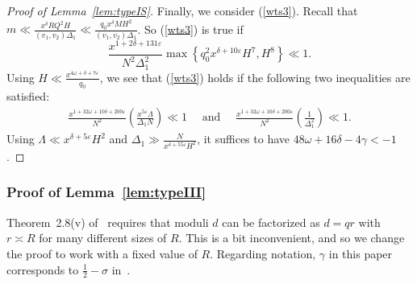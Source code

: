 \documentclass{amsart}
\numberwithin{equation}{section}
\begin{document}
\begin{proof}[Proof of Lemma~\ref{lem:typeIS}]
 Finally, we consider (\ref{wts3}). Recall that  $m \ll  \tfrac{x^\delta RQ^2H}{  (v_1,v_2)\Delta_1}  \ll \frac{q_0 x^\delta M H^2}{(v_1,v_2)\Delta_1}$. So (\ref{wts3}) is true if 
$$\frac{ x^{1+2\delta+131\varepsilon } }{N^2 \Delta_1^2} \max\left\{q_0^2x^{\delta+10\varepsilon}H^7,H^8\right\}\ll  1.$$
 Using $
 H \ll \tfrac{x^{4\omega+\delta+7\varepsilon}}{q_0}$, we see that (\ref{wts3}) holds if the following two inequalities are satisfied: 
 \begin{align} \label{twofinalinequalities}
 \frac{x^{1+32\omega+  10\delta+200\varepsilon}   }{N^2} \left(\frac{ x^{5\varepsilon}\Lambda}{\Delta_1N}\right)  \ll 1 \quad \mbox{ and } \quad  \frac{x^{1+32\omega+  10\delta+200\varepsilon}   }{N^2} \left(\frac{1}{\Delta_1^2}\right) \ll  1.
\end{align}
Using  $\Lambda \ll x^{\delta+5\varepsilon} H^2$ and  $\Delta_1 \gg \frac{N}{x^{\delta+55\varepsilon}H^2}$, it suffices to have
$ 48\omega +  16 \delta  -4\gamma  < -1 $.
\end{proof}

\subsubsection{Proof of Lemma~\ref{lem:typeIII}}

Theorem~2.8(v) of~\cite{Polymath:2014:EDZ} requires that moduli $d$ can be factorized as $d=qr$ with $r \asymp R$ for many different sizes of $R$. This is a bit inconvenient, and so we change the proof to  work with a fixed value of $R$.  Regarding notation, $\gamma$ in this paper corresponds to $\frac{1}{2}-\sigma$ in~\cite{Polymath:2014:EDZ}. 
\end{document}
